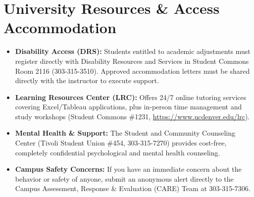 \documentclass[11pt,a4paper]{article}
\begin{document}
\section*{University Resources \& Access Accommodation}
\begin{itemize}[leftmargin=*]
    \item \textbf{Disability Access (DRS):} Students entitled to academic adjustments must register directly with Disability Resources and Services in Student Commons Room 2116 (303-315-3510). Approved accommodation letters must be shared directly with the instructor to execute support.
    \item \textbf{Learning Resources Center (LRC):} Offers 24/7 online tutoring services covering Excel/Tableau applications, plus in-person time management and study workshops (Student Commons \#1231, \url{https://www.ucdenver.edu/lrc}).
    \item \textbf{Mental Health \& Support:} The Student and Community Counseling Center (Tivoli Student Union \#454, 303-315-7270) provides cost-free, completely confidential psychological and mental health counseling.
    \item \textbf{Campus Safety Concerns:} If you have an immediate concern about the behavior or safety of anyone, submit an anonymous alert directly to the Campus Assessment, Response \& Evaluation (CARE) Team at 303-315-7306.
\end{itemize}
\end{document}

